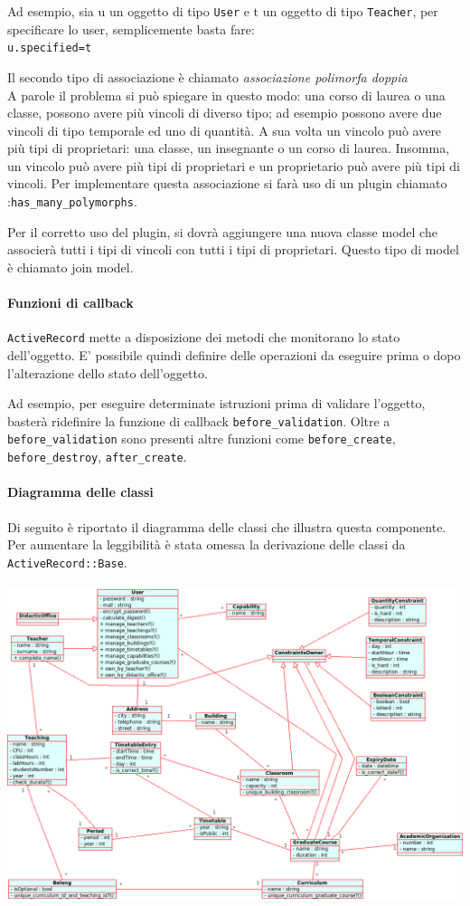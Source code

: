 \documentclass[11pt,a4paper]{article}
\begin{document}
Ad esempio, sia u un oggetto di tipo \verb|User| e t un oggetto di tipo \verb|Teacher|, per specificare lo user, semplicemente basta fare:\\
\verb|u.specified=t|

Il secondo tipo di associazione è chiamato \textit{associazione polimorfa doppia}\\ 
A parole il problema si può spiegare in questo modo: una corso di laurea o una classe, possono avere più vincoli di diverso tipo; ad esempio possono avere due vincoli di tipo temporale ed uno di quantità. A sua volta un vincolo può avere più tipi di proprietari: una classe, un insegnante o un corso di laurea.
Insomma, un vincolo può avere più tipi di proprietari e un proprietario può avere più tipi di vincoli. 
Per implementare questa associazione si farà uso di un plugin chiamato :\verb|has_many_polymorphs|. 


Per il corretto uso del plugin, si dovrà aggiungere una nuova classe model che associerà tutti i tipi di vincoli con tutti i tipi di proprietari. Questo tipo di model è chiamato join model.




\paragraph{Funzioni di callback}
\verb|ActiveRecord| mette a disposizione dei metodi che monitorano lo stato dell'oggetto. 
E' possibile quindi definire delle operazioni da eseguire prima o dopo l'alterazione dello stato dell'oggetto.


Ad esempio, per eseguire determinate istruzioni prima di validare l'oggetto, basterà ridefinire la funzione di callback \verb|before_validation|.
Oltre a \verb|before_validation| sono presenti altre funzioni come \verb|before_create|, \verb|before_destroy|, \verb|after_create|.

\paragraph{Diagramma delle classi}
Di seguito è riportato il diagramma delle classi che illustra questa componente. Per aumentare la leggibilità è stata omessa la derivazione delle classi da \verb|ActiveRecord::Base|. \\
\bigskip \\
\includegraphics[scale=0.34]{images/Model_ClassDiagram.png}
\end{document}

